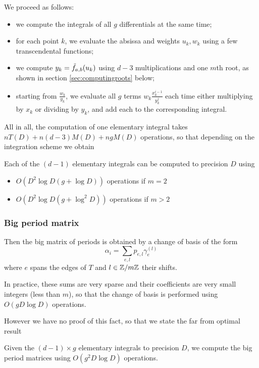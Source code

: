 \documentclass[main.tex]{subfiles}
\begin{document}
   We proceed as follows:
   \begin{itemize}
       \item we compute the integrals of all $g$ differentials at the same time;
   \item for each point $k$, we evaluate the absissa and weights $u_k,w_k$ using
       a few transcendental functions;
   \item we compute $y_k=\tilde{f}_{a,b}(u_k)$ using $d-3$ multiplications and one $m$th root,
       as shown in section \ref{sec:computingroots} below;
   \item starting from $\frac{w_k}{y_k}$, we evaluate all $g$ terms $w_k\frac{x_k^{i-1}}{y_k^j}$
       each time either multiplying by $x_k$ or dividing by $y_k$, and add each to the corresponding
       integral.
   \end{itemize}

   All in all, the computation of one elementary integral takes $nT(D)+n(d-3)M(D)+ngM(D)$ operations,
   so that depending on the integration scheme we obtain
   \begin{thm}
       \label{thm:complexity_integrals}
       Each of the $(d-1)$ elementary integrals can be computed to precision $D$ using
       \begin{itemize}
           \item $O(D^2\log D (g + \log D))$ operations if $m=2$
           \item $O(D^2\log D (g + \log^2 D))$ operations if $m>2$
       \end{itemize}
   \end{thm}

   \subsubsection{Big period matrix}

   Then the big matrix of periods is obtained by a change of basis
   of the form
   \begin{equation}
       \alpha_i = \sum_{e,l} p_{e,l}\gamma_e^{(l)}
   \end{equation}
   where $e$ spans the edges of $T$ and $l\in\mathbb{Z}/m\mathbb{Z}$ their shifts.

   In practice, these sums are very sparse and their coefficients are very small integers
   (less than $m$), so that the change of basis is performed using $O(gD\log D)$ operations.

   However we have no proof of this fact, so that we state the far from optimal
   result
   \begin{thm}
       Given the $(d-1)\times g$ elementary integrals to precision $D$,
       we compute the big period matrices using $O(g^2D\log D)$ operations.
   \end{thm}
\end{document}
